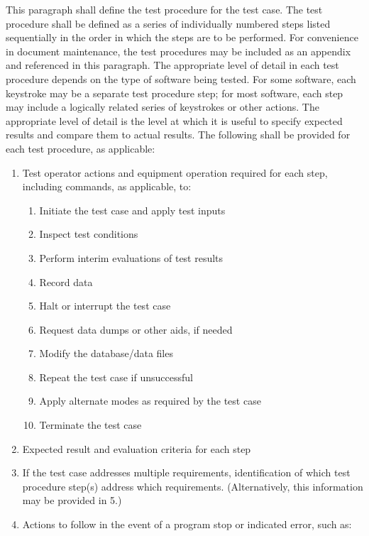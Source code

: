 \documentclass{fidata-report-template}
\begin{document}
This paragraph shall define the test procedure for the test case. The
test procedure shall be defined as a series of individually numbered
steps listed sequentially in the order in which the steps are to be
performed. For convenience in document maintenance, the test procedures
may be included as an appendix and referenced in this paragraph. The
appropriate level of detail in each test procedure depends on the type
of software being tested. For some software, each keystroke may be a
separate test procedure step; for most software, each step may include a
logically related series of keystrokes or other actions. The appropriate
level of detail is the level at which it is useful to specify expected
results and compare them to actual results. The following shall be
provided for each test procedure, as applicable:

\begin{enumerate}
\itemsep1pt\parskip0pt
\item
  Test operator actions and equipment operation required for each step,
  including commands, as applicable, to:

  \begin{enumerate}
  \itemsep1pt\parskip0pt
  \item
    Initiate the test case and apply test inputs
  \item
    Inspect test conditions
  \item
    Perform interim evaluations of test results
  \item
    Record data
  \item
    Halt or interrupt the test case
  \item
    Request data dumps or other aids, if needed
  \item
    Modify the database/data files
  \item
    Repeat the test case if unsuccessful
  \item
    Apply alternate modes as required by the test case
  \item
    Terminate the test case
  \end{enumerate}
\item
  Expected result and evaluation criteria for each step
\item
  If the test case addresses multiple requirements, identification of
  which test procedure step(s) address which requirements.
  (Alternatively, this information may be provided in 5.)
\item
  Actions to follow in the event of a program stop or indicated error,
  such as:


\end{enumerate}
\end{document}
